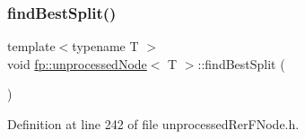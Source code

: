 \subsubsection{\texorpdfstring{find\+Best\+Split()}{findBestSplit()}\hspace{0.1cm}{\footnotesize\ttfamily [2/2]}}
{\footnotesize\ttfamily template$<$typename T $>$ \\
void \hyperlink{classfp_1_1unprocessedNode}{fp\+::unprocessed\+Node}$<$ T $>$\+::find\+Best\+Split (\begin{DoxyParamCaption}{ }\end{DoxyParamCaption})\hspace{0.3cm}{\ttfamily [inline]}}



Definition at line 242 of file unprocessed\+Rer\+F\+Node.\+h.


